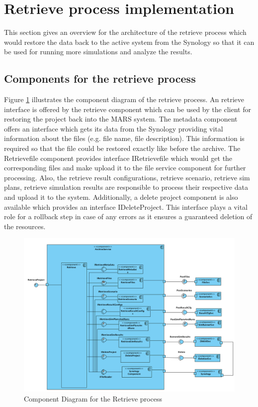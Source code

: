 \section{Retrieve process implementation}
This section gives an overview for the architecture of the retrieve process which would restore the data back to the active
system from the Synology so that it can be used for running more simulations and analyze the results.

\subsection{Components for the retrieve process}
 Figure \ref{fig:restore} illustrates the component diagram of the retrieve process. An retrieve interface is offered by the retrieve component which can be used by
 the client for restoring the project back into the MARS system. The metadata component offers an interface which gets its data from the Synology 
 providing vital information about the files (e.g. file name, file description). This information is required so that the file could be restored exactly like before the
 archive. The Retrievefile component provides interface IRetrievefile which would get the corresponding files and make upload it to the file service component for further
processing. Also, the retrieve result configurations, retrieve scenario, retrieve sim plans, retrieve simulation results are responsible to process their respective data and upload 
it to the system. Additionally, a delete project component is also available which provides an interface IDeleteProject. This interface plays a vital role for a rollback step
in case of any errors as it ensures a guaranteed deletion of the resources.

\begin{figure}[H]
    \centering \includegraphics[scale=0.46]{grafiken/restoreComponent.png}
    \caption{Component Diagram for the Retrieve process}
    \label{fig:restore}
\end{figure}

